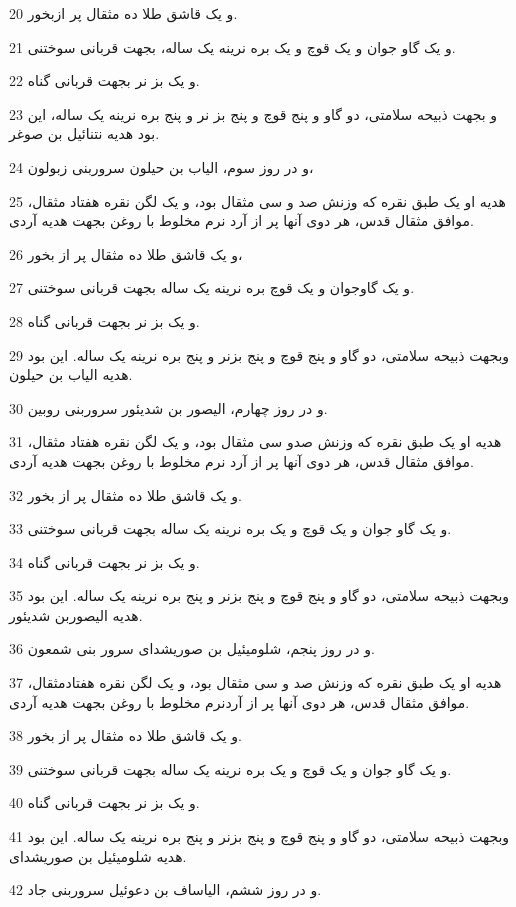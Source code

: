 \par 20 و یک قاشق طلا ده مثقال پر ازبخور.
\par 21 و یک گاو جوان و یک قوچ و یک بره نرینه یک ساله، بجهت قربانی سوختنی.
\par 22 و یک بز نر بجهت قربانی گناه.
\par 23 و بجهت ذبیحه سلامتی، دو گاو و پنج قوچ و پنج بز نر و پنج بره نرینه یک ساله، این بود هدیه نتنائیل بن صوغر.
\par 24 و در روز سوم، الیاب بن حیلون سروربنی زبولون،
\par 25 هدیه او یک طبق نقره که وزنش صد و سی مثقال بود، و یک لگن نقره هفتاد مثقال، موافق مثقال قدس، هر دوی آنها پر از آرد نرم مخلوط با روغن بجهت هدیه آردی.
\par 26 و یک قاشق طلا ده مثقال پر از بخور،
\par 27 و یک گاوجوان و یک قوچ بره نرینه یک ساله بجهت قربانی سوختنی.
\par 28 و یک بز نر بجهت قربانی گناه.
\par 29 وبجهت ذبیحه سلامتی، دو گاو و پنج قوچ و پنج بزنر و پنج بره نرینه یک ساله. این بود هدیه الیاب بن حیلون.
\par 30 و در روز چهارم، الیصور بن شدیئور سروربنی روبین.
\par 31 هدیه او یک طبق نقره که وزنش صدو سی مثقال بود، و یک لگن نقره هفتاد مثقال، موافق مثقال قدس، هر دوی آنها پر از آرد نرم مخلوط با روغن بجهت هدیه آردی.
\par 32 و یک قاشق طلا ده مثقال پر از بخور.
\par 33 و یک گاو جوان و یک قوچ و یک بره نرینه یک ساله بجهت قربانی سوختنی.
\par 34 و یک بز نر بجهت قربانی گناه.
\par 35 وبجهت ذبیحه سلامتی، دو گاو و پنج قوچ و پنج بزنر و پنج بره نرینه یک ساله. این بود هدیه الیصوربن شدیئور.
\par 36 و در روز پنجم، شلومیئیل بن صوریشدای سرور بنی شمعون.
\par 37 هدیه او یک طبق نقره که وزنش صد و سی مثقال بود، و یک لگن نقره هفتادمثقال، موافق مثقال قدس، هر دوی آنها پر از آردنرم مخلوط با روغن بجهت هدیه آردی.
\par 38 و یک قاشق طلا ده مثقال پر از بخور.
\par 39 و یک گاو جوان و یک قوچ و یک بره نرینه یک ساله بجهت قربانی سوختنی.
\par 40 و یک بز نر بجهت قربانی گناه.
\par 41 وبجهت ذبیحه سلامتی، دو گاو و پنج قوچ و پنج بزنر و پنج بره نرینه یک ساله. این بود هدیه شلومیئیل بن صوریشدای.
\par 42 و در روز ششم، الیاساف بن دعوئیل سروربنی جاد.

